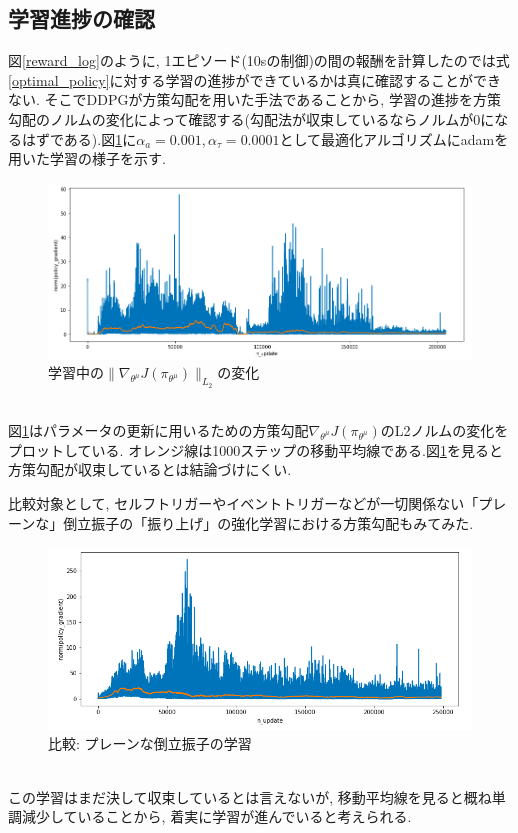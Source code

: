 \documentclass{jsarticle}
\begin{document}
\subsection{学習進捗の確認}
図\ref{reward_log}のように, 1エピソード(10sの制御)の間の報酬を計算したのでは式\eqref{optimal_policy}に対する学習の進捗ができているかは真に確認することができない. そこでDDPGが方策勾配を用いた手法であることから, 学習の進捗を方策勾配のノルムの変化によって確認する(勾配法が収束しているならノルムが0になるはずである).図\ref{gradient_log}に$\alpha_{a}=0.001, \alpha_{\tau}=0.0001$として最適化アルゴリズムにadamを用いた学習の様子を示す.
\begin{figure}[h]
	\centering
 	\includegraphics[width=15cm]{gradient_log.png}
 	\caption{学習中の$\|\nabla_{\theta^{\mu}}J(\pi_{\theta^{\mu}})\|_{L_2}$の変化}  \label{gradient_log}
\end{figure}\\
図\ref{gradient_log}はパラメータの更新に用いるための方策勾配$\nabla_{\theta^{\mu}}J(\pi_{\theta^{\mu}})$のL2ノルムの変化をプロットしている. オレンジ線は1000ステップの移動平均線である.図\ref{gradient_log}を見ると方策勾配が収束しているとは結論づけにくい.
\par
比較対象として, セルフトリガーやイベントトリガーなどが一切関係ない「プレーンな」倒立振子の「振り上げ」の強化学習における方策勾配もみてみた.
\begin{figure}[h]
	\centering
 	\includegraphics[width=16cm]{gradient_log_plain.png}
 	\caption{比較: プレーンな倒立振子の学習}  \label{gradient_log_plain}
\end{figure}\\
この学習はまだ決して収束しているとは言えないが, 移動平均線を見ると概ね単調減少していることから, 着実に学習が進んでいると考えられる. 
\end{document}
